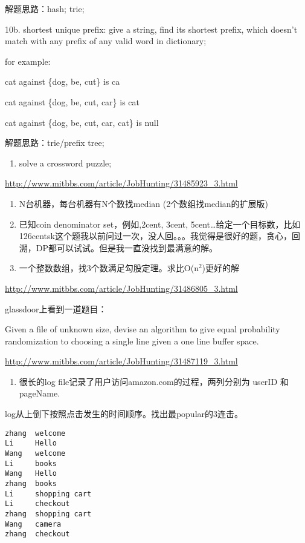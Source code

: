 \documentclass[12pt]{book}
\begin{document}
解题思路：hash; trie; 

10b. shortest unique prefix: give a string, find its shortest prefix, which doesn't match with any prefix of any valid word in dictionary;

for example:

cat against \{dog, be, cut\} is ca

cat against \{dog, be, cut, car\} is cat

cat against \{dog, be, cut, car, cat\} is null 

解题思路：trie/prefix tree;

\begin{enumerate}
\item solve a crossword puzzle;
\end{enumerate}

\url{http://www.mitbbs.com/article/JobHunting/31485923_3.html}

\begin{enumerate}
\item N台机器，每台机器有N个数找median (2个数组找median的扩展版)

\item 已知coin denominator set，例如,2cent, 3cent, 5cent\ldots{}给定一个目标数，比如126centsk这个题我以前问过一次，没人回。。。我觉得是很好的题，贪心，回溯，DP都可以试试。但是我一直没找到最满意的解。

\item 一个整数数组，找3个数满足勾股定理。求比O(n$^{\text{2}}$)更好的解
\end{enumerate}

\url{http://www.mitbbs.com/article/JobHunting/31486805_3.html}

glassdoor上看到一道题目：

Given a file of unknown size, devise an algorithm to give equal probability randomization to choosing a single line given a one line buffer space.

\url{http://www.mitbbs.com/article/JobHunting/31487119_3.html}

\begin{enumerate}
\item 很长的log file记录了用户访问amazon.com的过程，两列分别为 userID 和 pageName.
\end{enumerate}

log从上倒下按照点击发生的时间顺序。找出最popular的3连击。
\lstset{language=java,label= ,caption= ,numbers=none}
\begin{lstlisting}
zhang  welcome
Li     Hello
Wang   welcome
Li     books
Wang   Hello
zhang  books
Li     shopping cart
Li     checkout
zhang  shopping cart
Wang   camera
zhang  checkout
\end{lstlisting}
\end{document}
